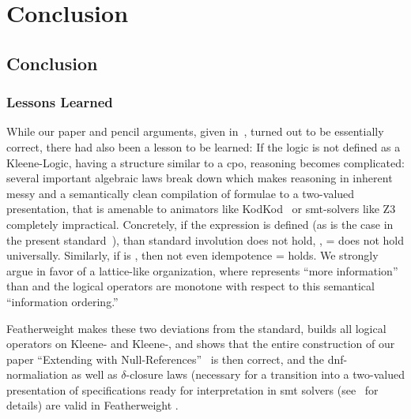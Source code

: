 \part{Conclusion}

\chapter{Conclusion}

\section{Lessons Learned}
While our paper and pencil arguments, given
in~\cite{brucker.ea:ocl-null:2009}, turned out to be essentially
correct, there had also been a lesson to be learned: If the logic is
not defined as a Kleene-Logic, having a structure similar to a
\acf{cpo}, reasoning becomes complicated: several important algebraic laws break down
which makes reasoning in \OCL inherent messy and a semantically clean
compilation of \OCL formulae to a two-valued presentation, that is
amenable to animators like KodKod~\cite{torlak.ea:kodkod:2007} or
\acs{smt}-solvers like Z3~\cite{moura.ea:z3:2008} completely
impractical. Concretely, if the expression 
is defined  (as is the case in the
present standard~\cite{omg:ocl:2012}), than standard involution does
not hold, \ie,  =  does not hold
universally. Similarly, if
 is , then not even
idempotence  =  holds. We strongly argue in favor of a lattice-like
organization, where  represents ``more information''
than  and the logical operators are monotone with
respect to this semantical ``information ordering.''

Featherweight \OCL makes these two deviations from the standard,
builds all logical operators on Kleene- and
Kleene-, and shows that the entire construction of our
paper ``Extending \OCL with
Null-References''~\cite{brucker.ea:ocl-null:2009} is then correct, and
the \acs{dnf}-normaliation as well as $\delta$-closure laws (necessary
for a transition into a two-valued presentation of \OCL specifications
ready for interpretation in \acs{smt} solvers
(see~\cite{brucker.ea:ocl-testing:2010} for details) are valid in
Featherweight \OCL.

